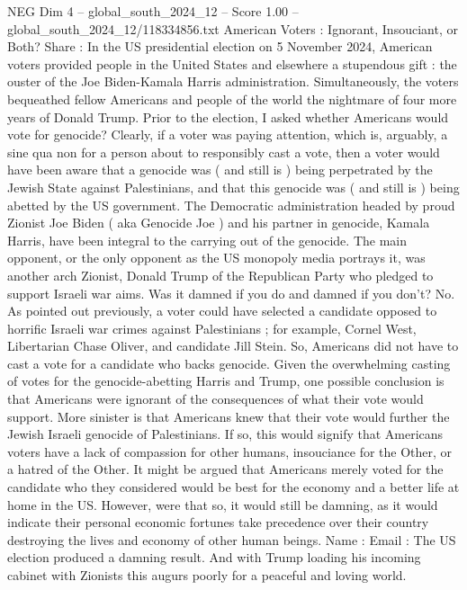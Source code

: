 \begin{textsample}{NEG Dim 4 – global\_south\_2024\_12 – Score 1.00 – global\_south\_2024\_12/118334856.txt}  \label{ex:f4_neg_202}
American Voters : Ignorant, Insouciant, or Both?
Share : In the US presidential election on 5 November 2024, American voters provided people in the United States and elsewhere a stupendous gift : the ouster of the Joe Biden-Kamala Harris administration.
Simultaneously, the voters bequeathed fellow Americans and people of the world the nightmare of four more years of Donald Trump.
Prior to the election, I asked whether Americans would vote for genocide?
Clearly, if a voter was paying attention, which is, arguably, a sine qua non for a person about to responsibly cast a vote, then a voter would have been aware that a genocide was ( and still is ) being perpetrated by the Jewish State against Palestinians, and that this genocide was ( and still is ) being abetted by the US government.
The Democratic administration headed by proud Zionist Joe Biden ( aka Genocide Joe ) and his partner in genocide, Kamala Harris, have been integral to the carrying out of the genocide.
The main opponent, or the only opponent as the US monopoly media portrays it, was another arch Zionist, Donald Trump of the Republican Party who pledged to support Israeli war aims.
Was it damned if you do and damned if you don't?
No.
As pointed out previously, a voter could have selected a candidate opposed to horrific Israeli war crimes against Palestinians ; for example, Cornel West, Libertarian Chase Oliver, and candidate Jill Stein.
So, Americans did not have to cast a vote for a candidate who backs genocide.
Given the overwhelming casting of votes for the genocide-abetting Harris and Trump, one possible conclusion is that Americans were ignorant of the consequences of what their vote would support.
More sinister is that Americans knew that their vote would further the Jewish Israeli genocide of Palestinians.
If so, this would signify that Americans voters have a lack of compassion for other humans, insouciance for the Other, or a hatred of the Other.
It might be argued that Americans merely voted for the candidate who they considered would be best for the economy and a better life at home in the US.
However, were that so, it would still be damning, as it would indicate their personal economic fortunes take precedence over their country destroying the lives and economy of other human beings.
Name : Email : The US election produced a damning result.
And with Trump loading his incoming cabinet with Zionists this augurs poorly for a peaceful and loving world.

\end{textsample}
